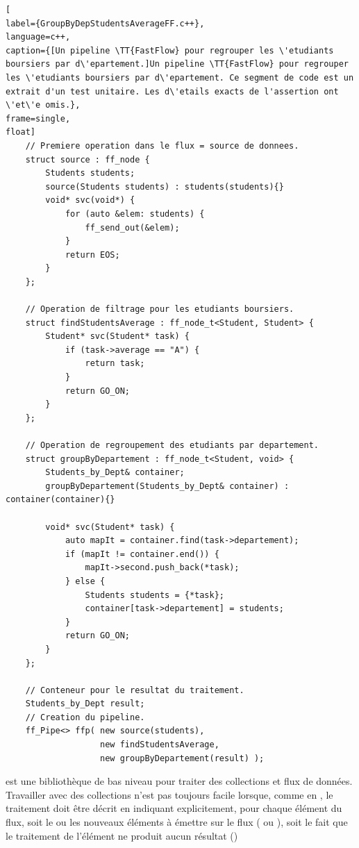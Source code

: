 

\begin{lstlisting}[
label={GroupByDepStudentsAverageFF.c++},
language=c++,
caption={[Un pipeline \TT{FastFlow} pour regrouper les \'etudiants boursiers par d\'epartement.]Un pipeline \TT{FastFlow} pour regrouper les \'etudiants boursiers par d\'epartement. Ce segment de code est un extrait d'un test unitaire. Les d\'etails exacts de l'assertion ont \'et\'e omis.},
frame=single,
float]
    // Premiere operation dans le flux = source de donnees.
	struct source : ff_node {
		Students students;
		source(Students students) : students(students){}
		void* svc(void*) {
			for (auto &elem: students) {
				ff_send_out(&elem);
			}	
			return EOS;	
		}
	};

	// Operation de filtrage pour les etudiants boursiers.
	struct findStudentsAverage : ff_node_t<Student, Student> {
		Student* svc(Student* task) {
			if (task->average == "A") {
				return task;
			}
			return GO_ON;
		}
	};

	// Operation de regroupement des etudiants par departement.
	struct groupByDepartement : ff_node_t<Student, void> {
		Students_by_Dept& container;
		groupByDepartement(Students_by_Dept& container) : container(container){}
		
		void* svc(Student* task) {
			auto mapIt = container.find(task->departement);
			if (mapIt != container.end()) {
				mapIt->second.push_back(*task);
			} else {
				Students students = {*task};
				container[task->departement] = students;
			}
			return GO_ON;		
		}
	};

	// Conteneur pour le resultat du traitement.
	Students_by_Dept result;
	// Creation du pipeline.
	ff_Pipe<> ffp( new source(students),
				   new findStudentsAverage,
				   new groupByDepartement(result) );        
\end{lstlisting}

 est une biblioth\`eque de bas niveau pour traiter des collections et flux de donn\'ees. Travailler avec des collections n'est pas toujours facile lorsque, comme en , le traitement doit être décrit en indiquant explicitement, pour chaque élément du flux,  soit le ou les nouveaux éléments à émettre sur le flux ( ou ), soit le fait que le traitement de l'élément ne produit aucun résultat ()

